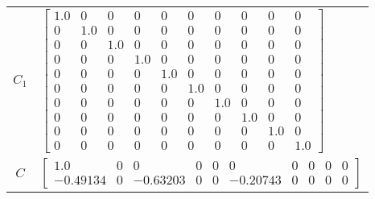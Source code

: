 \begin{tabular}{cl}
 $C_{1}$  & $\left[\begin{matrix}1.0 & 0 & 0 & 0 & 0 & 0 & 0 & 0 & 0 & 0\\0 & 1.0 & 0 & 0 & 0 & 0 & 0 & 0 & 0 & 0\\0 & 0 & 1.0 & 0 & 0 & 0 & 0 & 0 & 0 & 0\\0 & 0 & 0 & 1.0 & 0 & 0 & 0 & 0 & 0 & 0\\0 & 0 & 0 & 0 & 1.0 & 0 & 0 & 0 & 0 & 0\\0 & 0 & 0 & 0 & 0 & 1.0 & 0 & 0 & 0 & 0\\0 & 0 & 0 & 0 & 0 & 0 & 1.0 & 0 & 0 & 0\\0 & 0 & 0 & 0 & 0 & 0 & 0 & 1.0 & 0 & 0\\0 & 0 & 0 & 0 & 0 & 0 & 0 & 0 & 1.0 & 0\\0 & 0 & 0 & 0 & 0 & 0 & 0 & 0 & 0 & 1.0\end{matrix}\right]$                                                                                                                                                                                                                                                                                                                                                             \\
   $C$    & $\left[\begin{matrix}1.0 & 0 & 0 & 0 & 0 & 0 & 0 & 0 & 0 & 0\\-0.49134 & 0 & -0.63203 & 0 & 0 & -0.20743 & 0 & 0 & 0 & 0\end{matrix}\right]$                                                                                                                                                                                                                                                                                                                                                                                                                                                                                                                                                                                                                                                                                  \\

\end{tabular}
